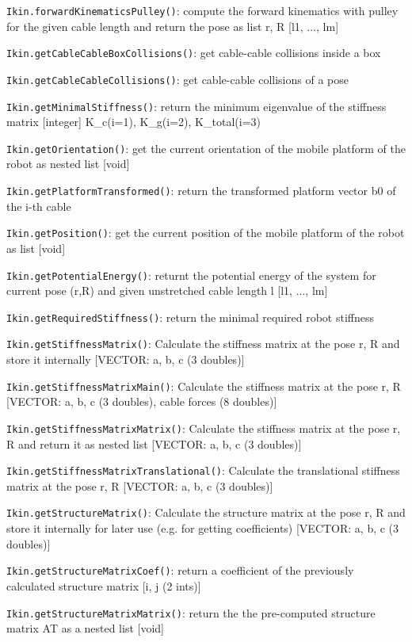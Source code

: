 \documentclass[11pt,a4paper,onepage,openany]{book}
\begin{document}
\texttt{Ikin.forwardKinematicsPulley()}: compute the forward kinematics with pulley for the given cable length and return the pose as list r, R [l1, ..., lm]

\texttt{Ikin.getCableCableBoxCollisions()}: get cable-cable collisions inside a box

\texttt{Ikin.getCableCableCollisions()}: get cable-cable collisions of a pose

\texttt{Ikin.getMinimalStiffness()}: return the minimum eigenvalue of the stiffness matrix [integer] K\_c(i=1), K\_g(i=2), K\_total(i=3)

\texttt{Ikin.getOrientation()}: get the current orientation of the mobile platform of the robot as nested list [void]

\texttt{Ikin.getPlatformTransformed()}: return the transformed platform vector b0 of the i-th cable

\texttt{Ikin.getPosition()}: get the current position of the mobile platform of the robot as list [void]

\texttt{Ikin.getPotentialEnergy()}: returnt the potential energy of the system for current pose (r,R) and given unstretched cable length l [l1, ..., lm]

\texttt{Ikin.getRequiredStiffness()}: return the minimal required robot stiffness

\texttt{Ikin.getStiffnessMatrix()}: Calculate the stiffness matrix at the pose r, R and store it internally [VECTOR: a, b, c (3 doubles)]

\texttt{Ikin.getStiffnessMatrixMain()}: Calculate the stiffness matrix at the pose r, R [VECTOR: a, b, c (3 doubles), cable forces (8 doubles)]

\texttt{Ikin.getStiffnessMatrixMatrix()}: Calculate the stiffness matrix at the pose r, R and return it as nested list [VECTOR: a, b, c (3 doubles)]

\texttt{Ikin.getStiffnessMatrixTranslational()}: Calculate the translational stiffness matrix at the pose r, R [VECTOR: a, b, c (3 doubles)]

\texttt{Ikin.getStructureMatrix()}: Calculate the structure matrix at the pose r, R and store it internally for later use (e.g. for getting coefficients) [VECTOR: a, b, c (3 doubles)]

\texttt{Ikin.getStructureMatrixCoef()}: return a coefficient of the previously calculated structure matrix [i, j (2 ints)]

\texttt{Ikin.getStructureMatrixMatrix()}: return the the pre-computed structure matrix AT as a nested list [void]
\end{document}
